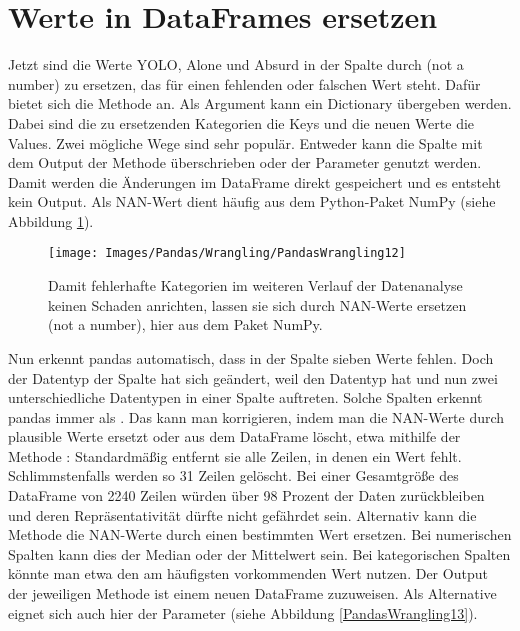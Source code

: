 \section{Werte in DataFrames ersetzen}

Jetzt sind die Werte YOLO, Alone und Absurd in der Spalte  durch  (not a number) zu ersetzen, das für einen fehlenden oder falschen Wert steht. Dafür bietet sich die Methode  an. Als Argument kann ein Dictionary übergeben werden. Dabei sind die zu ersetzenden Kategorien die Keys und die neuen Werte die Values. Zwei mögliche Wege sind sehr populär. Entweder kann die Spalte  mit dem Output der Methode  überschrieben oder der Parameter  genutzt werden. Damit werden die Änderungen im DataFrame direkt gespeichert und es entsteht kein Output. Als NAN-Wert dient häufig  aus dem Python-Paket NumPy (siehe Abbildung \ref{PandasWrangling12}).

\begin{figure}
    \centering
    \texttt{[image: Images/Pandas/Wrangling/PandasWrangling12]}    
    \caption{Damit fehlerhafte Kategorien im weiteren Verlauf der Datenanalyse keinen Schaden anrichten, lassen sie sich durch NAN-Werte ersetzen (not a number), hier aus dem Paket NumPy.} \label{PandasWrangling12}
\end{figure}

Nun erkennt pandas automatisch, dass in der Spalte  sieben Werte fehlen. Doch der Datentyp der Spalte hat sich geändert, weil  den Datentyp  hat und nun zwei unterschiedliche Datentypen in einer Spalte auftreten. Solche Spalten erkennt pandas immer als . Das kann man korrigieren, indem man die NAN-Werte durch plausible Werte ersetzt oder aus dem DataFrame löscht, etwa mithilfe der Methode : Standardmäßig entfernt sie alle Zeilen, in denen ein Wert fehlt. Schlimmstenfalls werden so 31 Zeilen gelöscht. Bei einer Gesamtgröße des DataFrame von 2240 Zeilen würden über 98 Prozent der Daten zurückbleiben und deren Repräsentativität dürfte nicht gefährdet sein. Alternativ kann die Methode  die NAN-Werte durch einen bestimmten Wert ersetzen. Bei numerischen Spalten kann dies der Median oder der Mittelwert sein. Bei kategorischen Spalten könnte man etwa den am häufigsten vorkommenden Wert nutzen. Der Output der jeweiligen Methode ist einem neuen DataFrame zuzuweisen. Als Alternative eignet sich auch hier der Parameter  (siehe Abbildung \ref{PandasWrangling13}).

